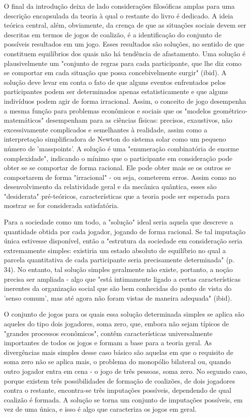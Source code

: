\documentclass[a4paper,12pt]{article}[abntex2]
\begin{document}
O final da introdução deixa de lado considerações filosóficas amplas para uma descrição encapsulada da teoria à qual o restante do livro é dedicado. A ideia teórica central, além, obviamente, da crença de que as situações sociais devem ser descritas em termos de jogos de coalizão, é a identificação do conjunto de possíveis resultados em um jogo. Esses resultados são soluções, no sentido de que constituem equilíbrios dos quais não há tendência de afastamento. Uma solução é plausivelmente um "conjunto de regras para cada participante, que lhe diz como se comportar em cada situação que possa concebivelmente surgir" (ibid). A solução deve levar em conta o fato de que alguns eventos enfrentados pelos participantes podem ser determinados apenas estatisticamente e que alguns indivíduos podem agir de forma irracional. Assim, o conceito de jogo desempenha a mesma função para problemas econômicos e sociais que os "modelos geométrico-matemáticos" desempenham para as ciências físicas: precisos, exaustivos, não excessivamente complicados e semelhantes à realidade, assim como a interpretação simplificadora de Newton do sistema solar como um pequeno número de 'masspoints'. A solução é uma "enumeração combinatória de enorme complexidade", indicando o mínimo que o participante em consideração pode obter se se comportar de forma racional. Ele pode obter mais se os outros se comportarem de forma "irracional" - ou seja, cometerem erros. Assim como no desenvolvimento da relatividade geral e da mecânica quântica, esses são "desiderata" pré-teóricos, características que a teoria pode ser esperada para mostrar se for considerada satisfatória.

Para a sociedade como um todo, a "solução" ideal seria aquela que descreve a quantidade obtida por cada jogador, jogando de forma racional. Se tal imputação única estivesse disponível, então a "estrutura da sociedade em consideração seria extremamente simples: existiria um estado absoluto de equilíbrio no qual a parcela quantitativa de cada participante seria precisamente determinada" (p. 34). No entanto, tal solução simples geralmente não existe, portanto, a noção precisa ser ampliada - algo que "está intimamente ligado a certas características inerentes da organização social que são bem conhecidas do ponto de vista do 'senso comum', mas até agora não foram vistas de maneira adequada" (ibid).

O conjunto de jogos para os quais essa solução determinada simples se aplica são aqueles do tipo dois jogadores, soma zero, que, embora não sejam típicos de "grandes processos econômicos", contêm características universalmente importantes de todos os jogos e formam a base para a teoria geral. As divergências mais simples desse caso básico são aquelas em que o requisito de soma zero não se aplica mais, o problema do monopólio bilateral ou, quando outro jogador entra em cena - o jogo de três pessoas, soma zero. No segundo caso, porque existem três possibilidades de formação de coalizões, de dois jogadores contra o restante, encontra-se três imputações possíveis, dependendo de qual coalizão é formada. A solução se torna um conjunto de imputações possíveis, em vez de uma única, e isso é algo que caracteriza os jogos em geral.
\end{document}
